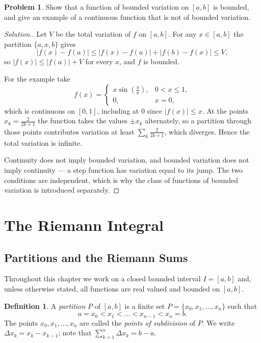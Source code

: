 \documentclass[11pt,a4paper]{article}
\numberwithin{equation}{section}
\theoremstyle{definition}
\newtheorem{defn}[thm]{Definition}
\newtheorem{problemx}{Problem}[subsection]
\newenvironment{problem}{\begin{problemx}}{\end{problemx}}
\newenvironment{solution}
  {\renewcommand{\qedsymbol}{}\begin{proof}[\textit{Solution}.]}
  {\end{proof}}
\begin{document}
\begin{problem}
Show that a function of bounded variation on $[a,b]$ is bounded, and give an
example of a continuous function that is not of bounded variation.
\end{problem}
\begin{solution}
Let $V$ be the total variation of $f$ on $[a,b]$. For any $x\in[a,b]$ the
partition $\{a,x,b\}$ gives
$$|f(x)-f(a)| \leq |f(x)-f(a)| + |f(b)-f(x)| \leq V,$$
so $|f(x)| \leq |f(a)| + V$ for every $x$, and $f$ is
bounded.

For the example take
$$f(x) = \begin{cases} x\sin\left(\frac{\pi}{x}\right), & 0<x\leq1,\\ 0, & x=0,\end{cases}$$
which is continuous on $[0,1]$, including at $0$ since
$|f(x)|\leq x$. At the points $x_k = \frac{2}{2k+1}$ the function takes the
values $\pm x_k$ alternately, so a partition through those points contributes
variation at least $\sum_k \frac{2}{2k+1}$, which diverges. Hence the total variation
is infinite.

Continuity does not imply bounded variation, and bounded variation does not
imply continuity --- a step function has variation equal to its jump. The two
conditions are independent, which is why the class of functions of bounded
variation is introduced separately.
\end{solution}


\section{The Riemann Integral}


\subsection{Partitions and the Riemann Sums}

Throughout this chapter we work on a closed bounded interval $I = [a,b]$ and, unless otherwise stated, all functions are real valued and bounded on $[a,b]$.


\begin{defn}
A \emph{partition} $P$ of $[a,b]$ is a finite set $P = \{x_0, x_1, \dots, x_n\}$ such that
$$a = x_0 < x_1 < \dots < x_{n - 1} < x_n = b .$$
The points $x_0, x_1, \dots, x_n$ are called the \emph{points of subdivision} of $P$. We write $\Delta x_k = x_k - x_{k - 1}$; note that $\sum^n_{k = 1} \Delta x_k = b- a$.
\end{defn}
\end{document}
